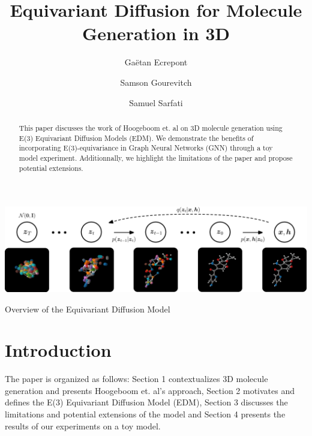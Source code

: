 \documentclass[sigconf]{acmart}
\begin{document}
\title{Equivariant Diffusion for Molecule Generation in 3D}

\author{Gaëtan Ecrepont}

\author{Samson Gourevitch}

\author{Samuel Sarfati}

\begin{abstract}
This paper discusses the work of Hoogeboom et. al \cite{edm} on 3D molecule generation using E(3) Equivariant Diffusion Models (EDM). We demonstrate the benefits of incorporating E(3)-equivariance in Graph Neural Networks (GNN) through a toy model experiment. Additionnally, we highlight the limitations of the paper and propose potential extensions.
\end{abstract}




\begin{teaserfigure}
  \includegraphics[width=\textwidth]{figures/overview_diffusion.pdf}
  \caption{Overview of the Equivariant Diffusion Model}
  \label{fig:teaser}
\end{teaserfigure}

\maketitle

\section{Introduction} %

The paper is organized as follows: Section 1 contextualizes 3D molecule generation and presents Hoogeboom et. al's approach, Section 2 motivates and defines the E(3) Equivariant Diffusion Model (EDM), Section 3 discusses the limitations and potential extensions of the model and Section 4 presents the results of our experiments on a toy model.
\end{document}
